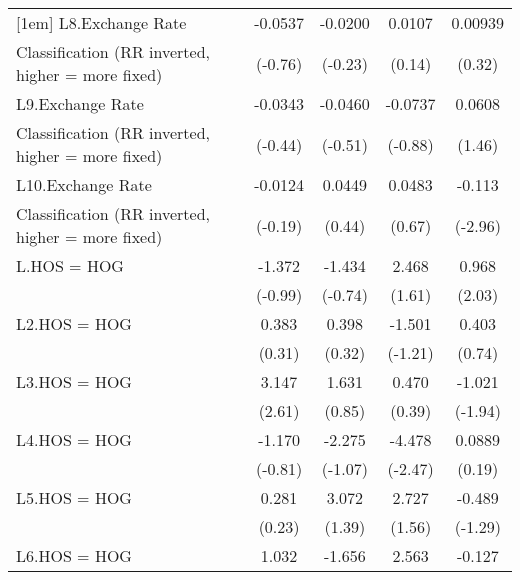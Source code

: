 {\begin{tabular}{l*{4}{c}}
[1em]
L8.Exchange Rate    &     -0.0537         &     -0.0200         &      0.0107         &     0.00939         \\
Classification (RR inverted, higher = more fixed)&     (-0.76)         &     (-0.23)         &      (0.14)         &      (0.32)         \\
[1em]
L9.Exchange Rate    &     -0.0343         &     -0.0460         &     -0.0737         &      0.0608         \\
Classification (RR inverted, higher = more fixed)&     (-0.44)         &     (-0.51)         &     (-0.88)         &      (1.46)         \\
[1em]
L10.Exchange Rate   &     -0.0124         &      0.0449         &      0.0483         &      -0.113\sym{**} \\
Classification (RR inverted, higher = more fixed)&     (-0.19)         &      (0.44)         &      (0.67)         &     (-2.96)         \\
[1em]
L.HOS = HOG         &      -1.372         &      -1.434         &       2.468         &       0.968\sym{*}  \\
                    &     (-0.99)         &     (-0.74)         &      (1.61)         &      (2.03)         \\
[1em]
L2.HOS = HOG        &       0.383         &       0.398         &      -1.501         &       0.403         \\
                    &      (0.31)         &      (0.32)         &     (-1.21)         &      (0.74)         \\
[1em]
L3.HOS = HOG        &       3.147\sym{**} &       1.631         &       0.470         &      -1.021         \\
                    &      (2.61)         &      (0.85)         &      (0.39)         &     (-1.94)         \\
[1em]
L4.HOS = HOG        &      -1.170         &      -2.275         &      -4.478\sym{*}  &      0.0889         \\
                    &     (-0.81)         &     (-1.07)         &     (-2.47)         &      (0.19)         \\
[1em]
L5.HOS = HOG        &       0.281         &       3.072         &       2.727         &      -0.489         \\
                    &      (0.23)         &      (1.39)         &      (1.56)         &     (-1.29)         \\
[1em]
L6.HOS = HOG        &       1.032         &      -1.656         &       2.563\sym{*}  &      -0.127         \\

\end{tabular}}
